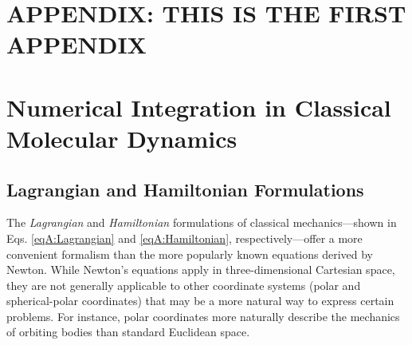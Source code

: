 %

{\chapter*{APPENDIX: THIS IS THE FIRST APPENDIX}
\setcounter{chapter}{1}}
{\chapter{Numerical Integration in Classical Molecular Dynamics}}
\label{appendixA}

\section{Lagrangian and Hamiltonian Formulations}

The \emph{Lagrangian} and \emph{Hamiltonian} formulations of classical
mechanics---shown in Eqs. \ref{eqA:Lagrangian} and \ref{eqA:Hamiltonian},
respectively---offer a more convenient formalism than the more popularly known
equations derived by Newton. \cite{CorbenClassicalMechanics} While Newton's
equations apply in three-dimensional Cartesian space, they are not generally
applicable to other coordinate systems (\eg polar and spherical-polar
coordinates) that may be a more natural way to express certain problems. For
instance, polar coordinates more naturally describe the mechanics of orbiting
bodies than standard Euclidean space.


